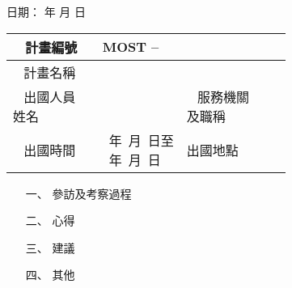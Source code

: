 \documentclass[12pt]{article}
\begin{document}
\hfill{\small 日期：   年   月   日 }
\begin{table}[h!]{\renewcommand{\arraystretch}{2}
    \begin{tabular}{|l|l|l|l|}
    \hline
   ~ 計畫編號 ~ & \multicolumn{3}{l|}{MOST  --} \\ \hline
   ~ 計畫名稱 ~ & \multicolumn{3}{l|}{} \\ \hline
    \makecell{~ 出國人員 ~\\ 姓名} & ~ \hspace*{5cm} & \makecell{~ 服務機關 ~\\及職稱} & ~ \hspace*{5cm} \\ \hline    
   ~ 出國時間 ~ & \makecell{~年~月~日至\\  ~年~月~日} & 出國地點 & ~ \\ \hline
  
    \end{tabular}
}
\end{table}
\begin{enumerate}
\item[一、] 參訪及考察過程

\item[二、] 心得

\item[三、] 建議

\item[四、]  其他

\end{enumerate}
\end{document}
